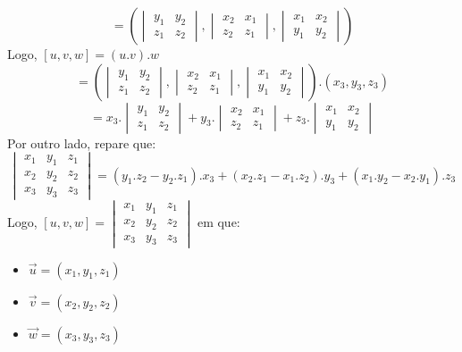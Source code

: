 \documentclass[ ]{article}
\begin{document}
			$$= (
			\begin{vmatrix}
			y_1 & y_2\\
			z_1&z_2
			\end{vmatrix}
			,
			\begin{vmatrix}
				x_2&x_1\\
				z_2&z_1
			\end{vmatrix}
			,
			\begin{vmatrix}
				x_1&x_2\\
				y_1&y_2
			\end{vmatrix}
			)$$			
		Logo, $[u,v,w] = (u.v).w$
		$$=(
			\begin{vmatrix}
			y_1 & y_2\\
			z_1&z_2
			\end{vmatrix}
			,
			\begin{vmatrix}
				x_2&x_1\\
				z_2&z_1
			\end{vmatrix}
			,
			\begin{vmatrix}
				x_1&x_2\\
				y_1&y_2
			\end{vmatrix}
			).
			(x_3,y_3,z_3)
		$$
		$$=
			x_3.
			\begin{vmatrix}
			y_1 & y_2\\
			z_1&z_2
			\end{vmatrix}
			+ y_3.
			\begin{vmatrix}
				x_2&x_1\\
				z_2&z_1
			\end{vmatrix}
			+z_3.
			\begin{vmatrix}
				x_1&x_2\\
				y_1&y_2
			\end{vmatrix}
			$$	
			Por outro lado, repare que:\\
					$$
					\begin{vmatrix}
						x_1 & y_1 & z_1\\
						x_2 & y_2 & z_2\\
						x_3 & y_3 & z_3
					\end{vmatrix}
					= (y_1.z_2-y_2.z_1).x_3 + (x_2.z_1-x_1.z_2).y_3+(x_1.y_2-x_2.y_1).z_3
					$$
			Logo, $ [u,v,w] = 
				\begin{vmatrix}
					x_1&y_1&z_1\\
					x_2&y_2&z_2\\
					x_3&y_3&z_3
				\end{vmatrix}						
			$ em que:
			\begin{itemize}
				\item $\overrightarrow{u} = (x_1,y_1,z_1)$
				\item $\overrightarrow{v} = (x_2,y_2,z_2)$
				\item $\overrightarrow{w} = (x_3,y_3,z_3)$
			\end{itemize}
\end{document}
